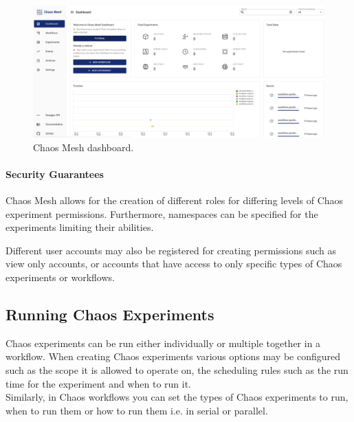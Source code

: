 \documentclass[conference]{IEEEtran}
\begin{document}
\begin{figure}
	\centering
	\includegraphics[width=0.8\linewidth]{chaos_mesh_dashboard}
	\caption{Chaos Mesh dashboard.}
	\label{fig:chaosmeshdashboard}
\end{figure}


\paragraph{Security Guarantees}
Chaos Mesh allows for the creation of different roles for differing levels of Chaos experiment permissions. Furthermore, namespaces can be specified for the experiments limiting their abilities.

Different user accounts may also be registered for creating permissions such as view only accounts, or accounts that have access to only specific types of Chaos experiments or workflows.


\subsection{Running Chaos Experiments}

Chaos experiments can be run either individually or multiple together in a workflow. When creating Chaos experiments various options may be configured such as the scope it is allowed to operate on, the scheduling rules such as the run time for the experiment and when to run it.\\
Similarly, in Chaos workflows you can set the types of Chaos experiments to run, when to run them or how to run them i.e. in serial or parallel.
\end{document}
